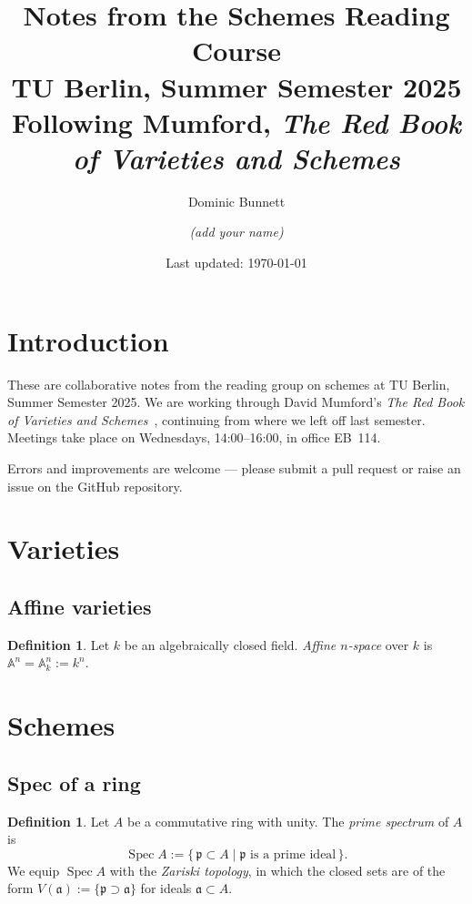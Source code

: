 \documentclass[a4paper, 12pt]{article}
\title{\textbf{Notes from the Schemes Reading Course}\\
\large TU Berlin, Summer Semester 2025\\
\normalsize Following Mumford, \emph{The Red Book of Varieties and Schemes}}
\author{Dominic Bunnett \and \textit{(add your name)}}
\date{Last updated: \today}
\theoremstyle{plain}
\theoremstyle{definition}
\newtheorem{definition}[theorem]{Definition}
\newcommand{\Spec}{\operatorname{Spec}}
\newcommand{\kk}{k}                    %
\newcommand{\AA}{\mathbb{A}}
\begin{document}
\maketitle
\tableofcontents
\newpage

\section*{Introduction}
These are collaborative notes from the reading group on schemes at TU Berlin,
Summer Semester 2025. We are working through David Mumford's
\emph{The Red Book of Varieties and Schemes}~\cite{Mumford}, continuing from
where we left off last semester. Meetings take place on Wednesdays, 14:00--16:00,
in office EB~114.

Errors and improvements are welcome --- please submit a pull request or raise
an issue on the GitHub repository.

\section{Varieties}


\subsection{Affine varieties}

\begin{definition}
  Let $\kk$ be an algebraically closed field. \emph{Affine $n$-space} over $\kk$
  is $\AA^n = \AA^n_\kk := \kk^n$.
\end{definition}


\section{Schemes}


\subsection{Spec of a ring}

\begin{definition}
  Let $A$ be a commutative ring with unity. The \emph{prime spectrum} of $A$ is
  \[
    \Spec A := \{\, \mathfrak{p} \subset A \mid \mathfrak{p} \text{ is a prime ideal} \,\}.
  \]
  We equip $\Spec A$ with the \emph{Zariski topology}, in which the closed sets
  are of the form $V(\mathfrak{a}) := \{\mathfrak{p} \supset \mathfrak{a}\}$ for
  ideals $\mathfrak{a} \subset A$.
\end{definition}
\end{document}
